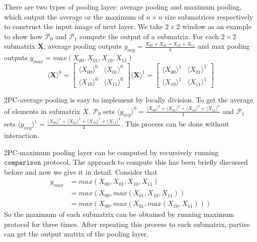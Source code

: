 \documentclass[letterpaper]{article} %
\begin{document}
    There are two types of pooling layer: average pooling and maximum pooling,
    which output the average or the maximum of $n\times n$ size submatrices respectively
    to construct the input image of next layer.
    We take $2\times 2$ window as an example to show how $\mathcal{P}_{0}$ and $\mathcal{P}_{1}$ compute the output of a submatrix.
    For each $2\times 2$ submatrix $\mathbf{X}$, average pooling outputs $y_{avg}=\frac{X_{00}+ X_{01}+ X_{10}+  X_{11}}{4}$
    and max pooling outputs $y_{max}=max(X_{00}, X_{01}, X_{10},  X_{11})$
    $$  \langle \mathbf{X}\rangle ^{0}= \begin{bmatrix}
        \langle X_{00}\rangle ^{0}& \langle X_{01}\rangle ^{0} \\
        \langle X_{10}\rangle ^{0}& \langle X_{11}\rangle ^{0}
       \end{bmatrix}\langle \mathbf{X}\rangle ^{1}=\begin{bmatrix}
        \langle X_{00}\rangle ^{1}& \langle X_{01}\rangle ^{1} \\
        \langle X_{10}\rangle ^{1}& \langle X_{11}\rangle ^{1}
       \end{bmatrix}$$



    2PC-average pooling is easy to implement by locally division.
    To get the average of elements in submatrix $X$,
    $\mathcal{P}_{0}$ sets $\langle y_{avg}\rangle^{0} =$$ \frac{\langle X_{00}\rangle ^{0}+ \langle X_{01}\rangle ^{0}+
    \langle X_{10}\rangle ^{0}+ \langle X_{11}\rangle ^{0}}{4}$ and
    $\mathcal{P}_{1}$ sets $\langle y_{avg}\rangle^{1} = \frac{\langle X_{00}\rangle ^{1}+ \langle X_{01}\rangle ^{1}+
    \langle X_{10}\rangle ^{1}+ \langle X_{11}\rangle ^{1}}{4}$. This process can be done without interaction.

    2PC-maximum pooling layer can be computed by recursively running $\mathtt{comparison}$ protocol.
    The approach to compute this has been briefly discussed before and now we give it in detail.
    Consider that
    \begin{align*}
        y_{max} &= max(X_{00}, X_{01}, X_{10}, X_{11}) \\
        &= max(X_{00},max(X_{01}, X_{10}, X_{11})) \\
      &= max(X_{00},max(X_{01},max(X_{10}, X_{11})))
    \end{align*}
    So the maximum of each submatrix can be obtained by running
    maximum protocol for three times.
    After repeating this process to each submatrix, parties can get the output matrix of the pooling layer.
\end{document}

